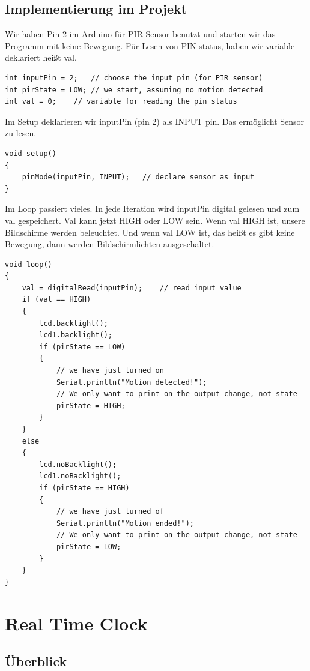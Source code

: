 \documentclass[conference]{IEEEtran}
\begin{document}
\subsection{Implementierung im Projekt}
Wir haben Pin 2 im Arduino für PIR Sensor benutzt und starten wir das Programm mit keine Bewegung.  Für Lesen von PIN status, haben wir variable deklariert heißt val.

\begin{lstlisting}[style=CStyle]
int inputPin = 2;	// choose the input pin (for PIR sensor)
int pirState = LOW;	// we start, assuming no motion detected
int val = 0;	// variable for reading the pin status

\end{lstlisting}

Im Setup deklarieren wir inputPin (pin 2) als INPUT pin. Das ermöglicht Sensor zu lesen.

\begin{lstlisting}[style=CStyle]
void setup()
{
	pinMode(inputPin, INPUT);	// declare sensor as input
}
\end{lstlisting}\textbf{}

Im Loop passiert vieles. In jede Iteration wird  inputPin digital gelesen und  zum val gespeichert. Val kann jetzt HIGH oder LOW sein. Wenn val HIGH ist,  unsere Bildschirme werden beleuchtet.  Und wenn val LOW ist, das heißt es gibt keine Bewegung, dann werden Bildschirmlichten ausgeschaltet. 

\begin{lstlisting}[style=CStyle]
void loop()
{
	val = digitalRead(inputPin);	// read input value
	if (val == HIGH)
	{
		lcd.backlight();
		lcd1.backlight();
		if (pirState == LOW)
		{
			// we have just turned on
			Serial.println("Motion detected!");
			// We only want to print on the output change, not state
			pirState = HIGH;
		}
	}
	else
	{
		lcd.noBacklight();
		lcd1.noBacklight();
		if (pirState == HIGH)
		{
			// we have just turned of
			Serial.println("Motion ended!");
			// We only want to print on the output change, not state
			pirState = LOW;
		}
	}
}
\end{lstlisting}\textbf{}

\section{Real Time Clock }

\subsection{Überblick}
\end{document}
